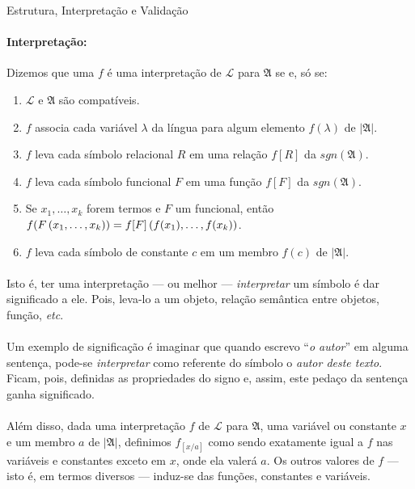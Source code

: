 \begin{definition}{Estrutura, Interpretação e Validação}
        \paragraph{Interpretação:}
            Dizemos que uma $f$ é uma interpretação de $\mathcal{L}$ para $\mathfrak{A}$
            se e, só se:
            \begin{enumerate}[label=(\alph*)]
                \item $\mathcal{L}$ e $\mathfrak{A}$ são compatíveis.
                \item $f$ associa cada variável $\lambda$ da língua para algum 
                    elemento $f(\lambda)$ de $|\mathfrak{A}|$.
                \item $f$ leva cada símbolo relacional   $R$ em uma relação $f[R]$ da $sgn(\mathfrak{A})$.
                \item $f$ leva cada símbolo funcional    $F$ em uma função  $f[F]$ da $sgn(\mathfrak{A})$.
                \item Se ${x_1},{\ldots},{x_k}$ forem termos e $F$ um funcional, então\\
                    $f(F\POINT{x_1}{\ldots}{x_k}) = f[F]\POINT{f(x_1)}{\ldots}{f(x_k)}$.
                \item $f$ leva cada símbolo de constante $c$ em um membro   $f(c)$ de $|\mathfrak{A}|$.
            \end{enumerate}
        \paragraph{}
            Isto é, ter uma interpretação --- ou melhor --- \emph{interpretar} um 
            símbolo é dar significado a ele. Pois, leva-lo a um objeto, relação 
            semântica entre objetos, função, \emph{etc}.
        \paragraph{}
            Um exemplo de significação é imaginar que quando escrevo ``\emph{o 
            autor}'' em alguma sentença, pode-se \emph{interpretar} como referente do 
            símbolo o \emph{autor deste texto}. Ficam, pois, definidas as propriedades 
            do signo e, assim, este pedaço da sentença ganha significado.
        \paragraph{}
            Além disso, dada uma interpretação $f$ de $\mathcal{L}$ para $\mathfrak{A}$,
            uma variável ou constante $x$ e um membro $a$ de $|\mathfrak{A}|$, 
            definimos $f_{[x\slash a]}$ como sendo exatamente igual a $f$ nas variáveis 
            e constantes exceto em $x$, onde ela valerá $a$. Os outros valores de $f$ 
            --- isto é, em termos diversos --- induz-se das funções, constantes e variáveis.

\end{definition}
